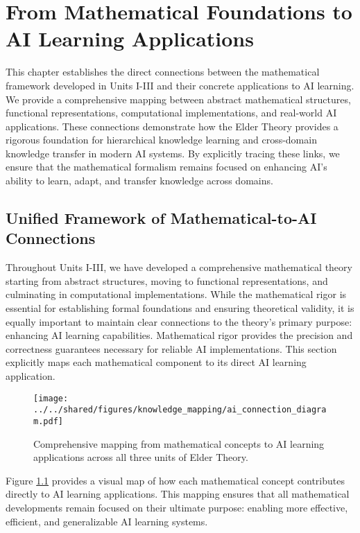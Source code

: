 \chapter{From Mathematical Foundations to AI Learning Applications}

\begin{tcolorbox}[colback=DarkSkyBlue!5!white,colframe=DarkSkyBlue!75!black,title=\textit{Chapter Summary}]
This chapter establishes the direct connections between the mathematical framework developed in Units I-III and their concrete applications to AI learning. We provide a comprehensive mapping between abstract mathematical structures, functional representations, computational implementations, and real-world AI applications. These connections demonstrate how the Elder Theory provides a rigorous foundation for hierarchical knowledge learning and cross-domain knowledge transfer in modern AI systems. By explicitly tracing these links, we ensure that the mathematical formalism remains focused on enhancing AI's ability to learn, adapt, and transfer knowledge across domains.
\end{tcolorbox}

\section{Unified Framework of Mathematical-to-AI Connections}

Throughout Units I-III, we have developed a comprehensive mathematical theory starting from abstract structures, moving to functional representations, and culminating in computational implementations. While the mathematical rigor is essential for establishing formal foundations and ensuring theoretical validity, it is equally important to maintain clear connections to the theory's primary purpose: enhancing AI learning capabilities. Mathematical rigor provides the precision and correctness guarantees necessary for reliable AI implementations. This section explicitly maps each mathematical component to its direct AI learning application.

\begin{figure}[h]
\centering
\texttt{[image: ../../shared/figures/knowledge\_mapping/ai\_connection\_diagram.pdf]}
\caption{Comprehensive mapping from mathematical concepts to AI learning applications across all three units of Elder Theory.}
\label{fig:ai_connection_diagram}
\end{figure}

Figure \ref{fig:ai_connection_diagram} provides a visual map of how each mathematical concept contributes directly to AI learning applications. This mapping ensures that all mathematical developments remain focused on their ultimate purpose: enabling more effective, efficient, and generalizable AI learning systems.

